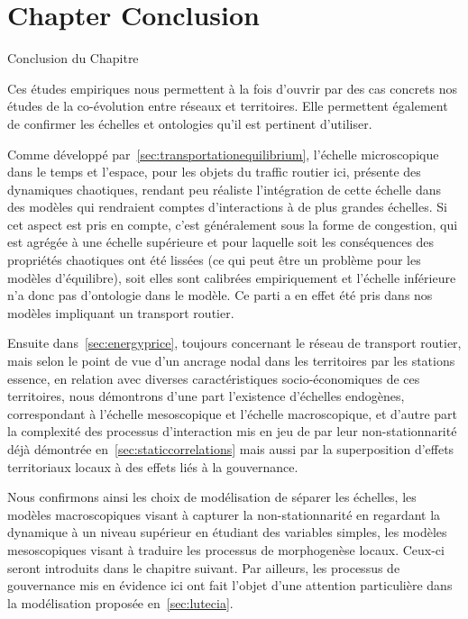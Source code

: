



\newpage


\section*{Chapter Conclusion}{Conclusion du Chapitre}





Ces études empiriques nous permettent à la fois d'ouvrir par des cas concrets nos études de la co-évolution entre réseaux et territoires. Elle permettent également de confirmer les échelles et ontologies qu'il est pertinent d'utiliser.

Comme développé par~\ref{sec:transportationequilibrium}, l'échelle microscopique dans le temps et l'espace, pour les objets du traffic routier ici, présente des dynamiques chaotiques, rendant peu réaliste l'intégration de cette échelle dans des modèles qui rendraient comptes d'interactions à de plus grandes échelles. Si cet aspect est pris en compte, c'est généralement sous la forme de congestion, qui est agrégée à une échelle supérieure et pour laquelle soit les conséquences des propriétés chaotiques ont été lissées (ce qui peut être un problème pour les modèles d'équilibre), soit elles sont calibrées empiriquement et l'échelle inférieure n'a donc pas d'ontologie dans le modèle. Ce parti a en effet été pris dans nos modèles impliquant un transport routier.

Ensuite dans~\ref{sec:energyprice}, toujours concernant le réseau de transport routier, mais selon le point de vue d'un ancrage nodal dans les territoires par les stations essence, en relation avec diverses caractéristiques socio-économiques de ces territoires, nous démontrons d'une part l'existence d'échelles endogènes, correspondant à l'échelle mesoscopique et l'échelle macroscopique, et d'autre part la complexité des processus d'interaction mis en jeu de par leur non-stationnarité déjà démontrée en~\ref{sec:staticcorrelations} mais aussi par la superposition d'effets territoriaux locaux à des effets liés à la gouvernance.


Nous confirmons ainsi les choix de modélisation de séparer les échelles, les modèles macroscopiques visant à capturer la non-stationnarité en regardant la dynamique à un niveau supérieur en étudiant des variables simples, les modèles mesoscopiques visant à traduire les processus de morphogenèse locaux. Ceux-ci seront introduits dans le chapitre suivant. Par ailleurs, les processus de gouvernance mis en évidence ici ont fait l'objet d'une attention particulière dans la modélisation proposée en~\ref{sec:lutecia}.








